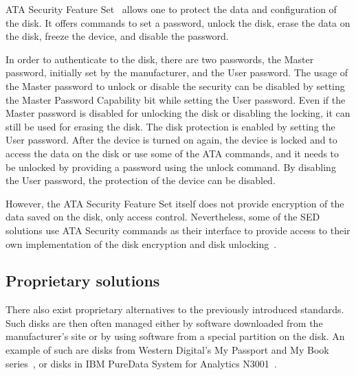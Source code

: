 ATA Security Feature Set~\cite{acs-3} allows one to protect the data and configuration of the disk.
It offers commands to set a password, unlock the disk, erase the data on the disk, freeze the device, and disable the password.

In order to authenticate to the disk, there are two passwords, the Master password, initially set by the manufacturer, and the User password.
The usage of the Master password to unlock or disable the security can be disabled by setting the Master Password Capability bit while setting the User password. Even if the Master password is disabled for unlocking the disk or disabling the locking, it can still be used for erasing the disk.
The disk protection is enabled by setting the User password. After the device is turned on again, the device is locked and to access the data on the disk or use some of the ATA commands, and it needs to be unlocked by providing a password using the unlock command. By disabling the User password, the protection of the device can be disabled.

However, the ATA Security Feature Set itself does not provide encryption of the data saved on the disk, only access control.
Nevertheless, some of the SED solutions use ATA Security commands as their interface to provide access to their own implementation of the disk encryption and disk unlocking~\cite{self_encrypting_deception}.


\subsection{Proprietary solutions}

There also exist proprietary alternatives to the previously introduced standards. Such disks are then often managed either by software downloaded from the manufacturer's site or by using software from a special partition on the disk.
An example of such are disks from Western Digital's My Passport and My Book series~\cite{got_hw_crypto}, or disks in IBM PureData System for Analytics N3001~\cite{ibm_sed}.



